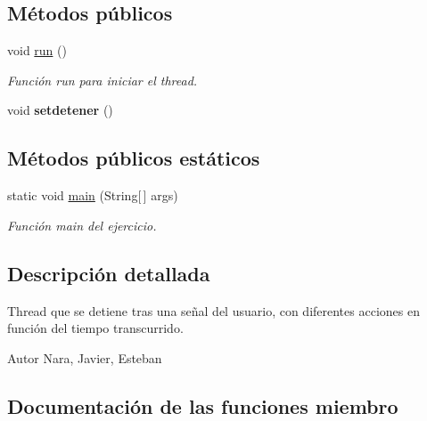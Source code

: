 \subsection*{Métodos públicos}
\begin{DoxyCompactItemize}
\item 
\hypertarget{class_ejercicio1__3__3_1_1_detener___interrupcion_a5c76a74a9d252bcbe4598f44f5446a4b}{}void \hyperlink{class_ejercicio1__3__3_1_1_detener___interrupcion_a5c76a74a9d252bcbe4598f44f5446a4b}{run} ()\label{class_ejercicio1__3__3_1_1_detener___interrupcion_a5c76a74a9d252bcbe4598f44f5446a4b}

\begin{DoxyCompactList}\small\item\em Función run para iniciar el thread. \end{DoxyCompactList}\item 
\hypertarget{class_ejercicio1__3__3_1_1_detener___interrupcion_ab9c8bbc6ee2ecc4c65b0e5103bdeb087}{}void {\bfseries setdetener} ()\label{class_ejercicio1__3__3_1_1_detener___interrupcion_ab9c8bbc6ee2ecc4c65b0e5103bdeb087}

\end{DoxyCompactItemize}
\subsection*{Métodos públicos estáticos}
\begin{DoxyCompactItemize}
\item 
static void \hyperlink{class_ejercicio1__3__3_1_1_detener___interrupcion_adfc3aa05263913c292052bc839e8ad97}{main} (String\mbox{[}$\,$\mbox{]} args)
\begin{DoxyCompactList}\small\item\em Función main del ejercicio. \end{DoxyCompactList}\end{DoxyCompactItemize}


\subsection{Descripción detallada}
Thread que se detiene tras una señal del usuario, con diferentes acciones en función del tiempo transcurrido. 

\begin{DoxyAuthor}{Autor}
Nara, Javier, Esteban 
\end{DoxyAuthor}


\subsection{Documentación de las funciones miembro}
\hypertarget{class_ejercicio1__3__3_1_1_detener___interrupcion_adfc3aa05263913c292052bc839e8ad97}{}
